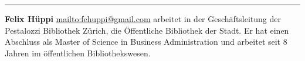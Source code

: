 \begin{center}\rule{0.5\linewidth}{\linethickness}\end{center}

\textbf{Felix Hüppi} \url{mailto:fehuppi@gmail.com} arbeitet in der
Geschäftsleitung der Pestalozzi Bibliothek Zürich, die Öffentliche
Bibliothek der Stadt. Er hat einen Abschluss als Master of Science in
Business Administration und arbeitet seit 8 Jahren im öffentlichen
Bibliothekswesen.
